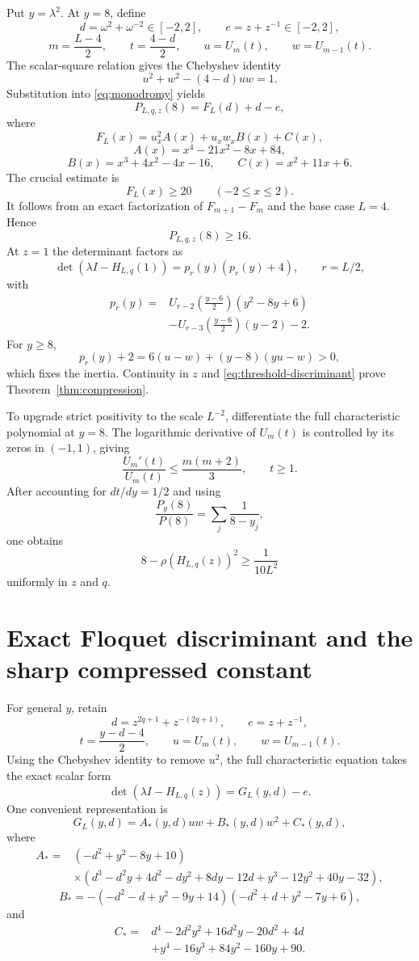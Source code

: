 \documentclass[11pt]{article}
\theoremstyle{remark}
\begin{document}
Put $y=\lambda^2$.  At $y=8$, define
\[
 d=\omega^2+\omega^{-2}\in[-2,2],
 \qquad
 e=z+z^{-1}\in[-2,2],
\]
\[
 m=\frac{L-4}{2},
 \qquad
 t=\frac{4-d}{2},
 \qquad
 u=U_m(t),
 \qquad
 w=U_{m-1}(t).
\]
The scalar-square relation gives the Chebyshev identity
\[
 u^2+w^2-(4-d)uw=1.
\]
Substitution into \eqref{eq:monodromy} yields
\begin{equation}
 P_{L,q,z}(8)=F_L(d)+d-e,
 \label{eq:threshold-discriminant}
\end{equation}
where
\[
 F_L(x)=u_x^2A(x)+u_xw_xB(x)+C(x),
\]
\[
 A(x)=x^4-21x^2-8x+84,
\]
\[
 B(x)=x^3+4x^2-4x-16,
 \qquad
 C(x)=x^2+11x+6.
\]
The crucial estimate is
\begin{equation}
 \boxed{F_L(x)\ge20\qquad(-2\le x\le2).}
 \label{eq:F-lower}
\end{equation}
It follows from an exact factorization of $F_{m+1}-F_m$ and the base case
$L=4$.  Hence
\[
 P_{L,q,z}(8)\ge16.
\]
At $z=1$ the determinant factors as
\[
 \det(\lambda I-H_{L,q}(1))
 =p_r(y)(p_r(y)+4),
 \qquad r=L/2,
\]
with
\[
\begin{aligned}
 p_r(y)={}&
 U_{r-2}\!\left(\frac{y-6}{2}\right)(y^2-8y+6)\\
 &-U_{r-3}\!\left(\frac{y-6}{2}\right)(y-2)-2.
\end{aligned}
\]
For $y\ge8$,
\[
 p_r(y)+2
 =6(u-w)+(y-8)(yu-w)>0,
\]
which fixes the inertia.  Continuity in $z$ and
\eqref{eq:threshold-discriminant} prove Theorem~\ref{thm:compression}.

To upgrade strict positivity to the scale $L^{-2}$, differentiate the full
characteristic polynomial at $y=8$.  The logarithmic derivative of
$U_m(t)$ is controlled by its zeros in $(-1,1)$, giving
\[
 \frac{U_m'(t)}{U_m(t)}
 \le \frac{m(m+2)}3,
 \qquad t\ge1.
\]
After accounting for $dt/dy=1/2$ and using
\[
 \frac{P_y(8)}{P(8)}
 =\sum_j\frac1{8-y_j},
\]
one obtains
\[
 8-\rho(H_{L,q}(z))^2
 \ge\frac1{10L^2}
\]
uniformly in $z$ and $q$.

\section{Exact Floquet discriminant and the sharp compressed constant}
\label{sec:sharp-compressed}

For general $y$, retain
\[
 d=z^{2q+1}+z^{-(2q+1)},
 \qquad e=z+z^{-1},
\]
\[
 t=\frac{y-d-4}{2},
 \qquad u=U_m(t),
 \qquad w=U_{m-1}(t).
\]
Using the Chebyshev identity to remove $u^2$, the full characteristic
equation takes the exact scalar form
\begin{equation}
 \boxed{\det(\lambda I-H_{L,q}(z))=G_L(y,d)-e.}
 \label{eq:full-discriminant}
\end{equation}
One convenient representation is
\[
 G_L(y,d)=A_*(y,d)uw+B_*(y,d)w^2+C_*(y,d),
\]
where
\[
\begin{aligned}
A_*={}&(-d^2+y^2-8y+10)\\
&\times(d^3-d^2y+4d^2-dy^2+8dy-12d
+y^3-12y^2+40y-32),
\end{aligned}
\]
\[
 B_*=-(-d^2-d+y^2-9y+14)
 (-d^2+d+y^2-7y+6),
\]
and
\[
\begin{aligned}
 C_*={}&d^4-2d^2y^2+16d^2y-20d^2+4d\\
 &+y^4-16y^3+84y^2-160y+90.
\end{aligned}
\]
\end{document}
